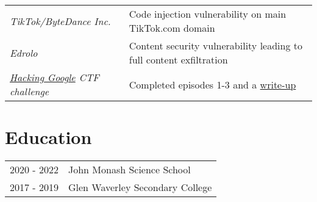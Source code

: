 \documentclass[a4paper,11pt]{article}
\begin{document}
\begin{tabularx}{\linewidth}{l X}
    \textit{TikTok/ByteDance Inc.} & \hfill Code injection vulnerability on main TikTok.com domain \\
    \textit{Edrolo} & \hfill Content security vulnerability leading to full content exfiltration \\
    \textit{\href{https://h4ck1ng.google/}{Hacking Google} CTF challenge} & \hfill Completed episodes 1-3 and a \href{https://srg.id.au/posts/hacking-google/}{write-up} \\
\end{tabularx}

\section{Education}
\begin{tabularx}{\linewidth}{@{}l X@{}}	

2020 - 2022 & John Monash Science School \hfill \normalsize \\
2017 - 2019 & Glen Waverley Secondary College \hfill \\ 

\end{tabularx}

\end{document}
